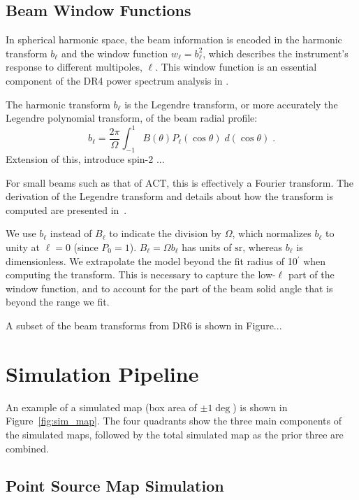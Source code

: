 \subsection{Beam Window Functions}
\label{subsec:window}

In spherical harmonic space, the beam information is encoded in the harmonic transform $b_{\ell}$ and the window function $w_{\ell} = b_{\ell}^2$, which describes the instrument's response to different multipoles, $\ell$. This window function is an essential component of the DR4 power spectrum analysis in \cite{choi_2020}.

The harmonic transform $b_{\ell}$ is the Legendre transform, or more accurately the Legendre polynomial transform, of the beam radial profile:
\begin{equation}
b_{\ell} = \frac{2\pi}{\Omega}\int_{-1}^{1} B(\theta)P_{\ell}(\cos\theta)\; d(\cos\theta) \; .
\label{eq:legendre}
\end{equation}
Extension of this, introduce spin-2 ...

For small beams such as that of ACT, this is effectively a Fourier transform. The derivation of the Legendre transform and details about how the transform is computed are presented in~\cite{Lungu_2022}.

We use $b_{\ell}$ instead of $B_{\ell}$ to indicate the division by $\Omega$, which normalizes $b_{\ell}$ to unity at $\ell = 0$ (since $P_0 = 1$). $B_{\ell} = \Omega b_{\ell}$ has units of $\mathrm{sr}$, whereas $b_{\ell}$ is dimensionless. We extrapolate the model beyond the fit radius of 10$^{\prime}$ when computing the transform.
This is necessary to capture the low-$\ell$ part of the window function, and to account for the part of the beam solid angle that is beyond the range we fit.

A subset of the beam transforms from DR6 is shown in Figure... 

\section{Simulation Pipeline}
\label{sec:sim_pipe}

An example of a simulated map (box area of $\pm1\deg$) is shown in Figure~\ref{fig:sim_map}.  The four quadrants show the three main components of the simulated maps, followed by the total simulated map as the prior three are combined.

\subsection{Point Source Map Simulation}
\label{subsec:sim_ptsrc}

